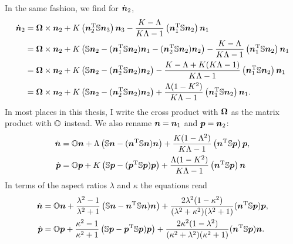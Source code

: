 \documentclass[thesis.tex]{subfiles}
\begin{document}
In the same fashion, we find for $\dot{\ve n}_2$,
\begin{align*}
	\dot{\ve n}_2
	&= \ve \Omega \cross \ve n_2
	 + K\left(\ve n_2\transpose \ma S\ve n_3\right)\ve n_3
	  - \frac{K- \Lambda}{K \Lambda - 1}\left(\ve n_1\transpose \ma S\ve n_2\right)\ve n_1 \\
	&= \ve \Omega \cross \ve n_2
	 + K\left(
\ma S \ve n_2 - (\ve n_1 \transpose \ma S \ve n_2) \ve n_1 - (\ve n_2 \transpose \ma S \ve n_2) \ve n_2
	 \right)
	  - \frac{K- \Lambda}{K \Lambda - 1}\left(\ve n_1\transpose \ma S\ve n_2\right)\ve n_1 \\
	&= \ve \Omega \cross \ve n_2
	 + K\left(
\ma S \ve n_2  - (\ve n_2 \transpose \ma S \ve n_2) \ve n_2
	 \right)
	  - \frac{K- \Lambda + K(K \Lambda - 1)}{K \Lambda - 1}\left(\ve n_1\transpose \ma S\ve n_2\right)\ve n_1\\
	&= \ve \Omega \cross \ve n_2
	 + K\left(
\ma S \ve n_2  - (\ve n_2 \transpose \ma S \ve n_2) \ve n_2
	 \right)
	  + \frac{\Lambda(1-K^2)}{K \Lambda - 1}\left(\ve n_1\transpose \ma S\ve n_2\right)\ve n_1.
\end{align*}
In most places in this thesis, I write the cross product with $\ve \Omega$ as the matrix product with $\ma O$ instead. We also rename $\ve n = \ve n_1$ and $\ve p = \ve n_2$:
\begin{align*}
	\dot{\ve n}	&= \ma O \ve n 
	+ \Lambda\left(
	\ma S \ve n - (\ve n \transpose \ma S \ve n) \ve n
	\right)
    + \frac{K(1- \Lambda^2)}{K \Lambda - 1}\left(\ve n\transpose \ma S\ve p\right)\ve p, \\
\dot{\ve p}	&=    \ma O \ve p
	 + K\left(
\ma S \ve p  - (\ve p \transpose \ma S \ve p) \ve p
	 \right)
	  + \frac{\Lambda(1-K^2)}{K \Lambda - 1}\left(\ve n\transpose \ma S\ve p\right)\ve n
\end{align*}
In terms of the aspect ratios $\lambda$ and $\kappa$ the equations read
\begin{align*}
	\dot{\ve n} &= \ma O \ve{n} + \frac{\lambda^2-1}{\lambda^2+1} \left(\ma S \ve n- \ve{n}\transpose \ma S \ve{n})\ve{n}\right) + \frac{ 2\lambda^2 (1 - \kappa^2) }{(\lambda^2+\kappa^2)(\lambda^2+1)}(\ve{n}\transpose \ma S \ve{p})\ve{p}, \nn\\
	\dot{\ve p} &= \ma O \ve{p} + \frac{\kappa^2-1}{\kappa^2+1}\left(\ma S \ve p - \ve{p}\transpose \ma S \ve{p})\ve{p}\right) + \frac{ 2\kappa^2 (1 - \lambda^2) }{(\kappa^2+\lambda^2)(\kappa^2+1)}(\ve{n}\transpose \ma S \ve{p})\ve{n}.
\end{align*}
\end{document}
